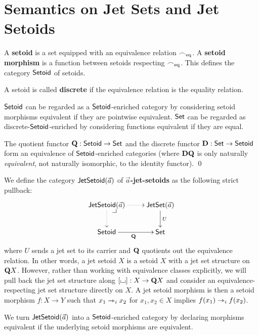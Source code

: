 \documentclass[a4paper]{memoir}
\begin{document}
\section{Semantics on Jet Sets and Jet Setoids} \label{sec:poresh-jetset}
\begin{definition} \label{def:setoid}
	A \textbf{setoid} is a set equipped with an equivalence relation ${\frown}_{{\mathrm{eq}}}$.
	A \textbf{setoid morphism} is a function between setoids respecting ${\frown}_{{\mathrm{eq}}}$.
	This defines the category ${\mathsf{Setoid}}$ of setoids.
	
	A setoid is called \textbf{discrete} if the equivalence relation is the equality relation.
	
	${\mathsf{Setoid}}$ can be regarded as a ${\mathsf{Setoid}}$-enriched category by considering setoid morphisms equivalent if they are pointwise equivalent.
	${\mathsf{Set}}$ can be regarded as discrete-${\mathsf{Setoid}}$-enriched by considering functions equivalent if they are equal.
\end{definition}
\begin{corollary} \label{thm:setoid-equiv-set}
	The quotient functor ${\mathbf{Q}} : {\mathsf{Setoid}} \to {\mathsf{Set}}$ and the discrete functor ${\mathbf{D}} : {\mathsf{Set}} \to {\mathsf{Setoid}}$ form an equivalence of ${\mathsf{Setoid}}$-enriched categories (where ${\mathbf{D}} {\mathbf{Q}}$ is only naturally \emph{equivalent}, not naturally isomorphic, to the identity functor). \qed
\end{corollary}
\begin{definition} \label{def:jetsetoid}
	We define the category $\mathsf{JetSetoid}(\vec a)$ of \textbf{$\vec a$-jet-setoids} as the following strict pullback:
	\[
		\xymatrix{
			\jetsetoid{\vec a}
				\xydrcorner
				\ar@{.>}[r]
				\ar@{.>}[d]
			&
			\jetset{\vec a}
				\ar[d]^U
			\\
			\Setoid
				\ar[r]_\setoidquot
			&
			\Set
		}
	\]
	where $U$ sends a jet set to its carrier and ${\mathbf{Q}}$ quotients out the equivalence relation.
	In other words, a jet setoid $X$ is a setoid $X$ with a jet set structure on ${\mathbf{Q}} X$.
	However, rather than working with equivalence classes explicitly, we will pull back the jet set structure along $[{\llcorner\hspace{-.4ex}\lrcorner}] : X \to {\mathbf{Q}} X$ and consider an equivalence-respecting jet set structure directly on $X$.
	A jet setoid morphism is then a setoid morphism $f : X \to Y$ such that $x_1 \rightarrowtriangle_i x_2$ for $x_1, x_2 \in X$ implies $f(x_1) \rightarrowtriangle_i f(x_2)$.
	
	We turn $\mathsf{JetSetoid}(\vec a)$ into a ${\mathsf{Setoid}}$-enriched category by declaring morphisms equivalent if the underlying setoid morphisms are equivalent.
\end{definition}
\end{document}
